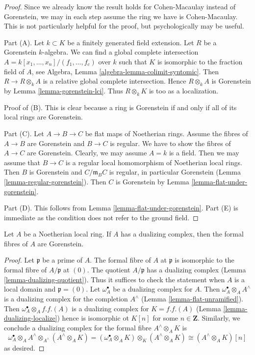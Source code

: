 \begin{proof}
Since we already know the result holds for Cohen-Macaulay instead
of Gorenstein, we may in each step assume the ring we have is
Cohen-Macaulay. This is not particularly helpful for the proof, but
psychologically may be useful.

\medskip\noindent
Part (A). Let $k \subset K$ be a finitely generated field extension.
Let $R$ be a Gorenstein $k$-algebra.
We can find a global complete intersection
$A = k[x_1, \ldots, x_n]/(f_1, \ldots, f_c)$
over $k$ such that $K$ is isomorphic to the fraction field of $A$, see
Algebra, Lemma \ref{algebra-lemma-colimit-syntomic}.
Then $R \to R \otimes_k A$ is a relative global complete intersection.
Hence $R \otimes_k A$ is Gorenstein by Lemma \ref{lemma-gorenstein-lci}.
Thus $R \otimes_k K$ is too as a localization.

\medskip\noindent
Proof of (B). This is clear because a ring is Gorenstein
if and only if all of its local rings are Gorenstein.

\medskip\noindent
Part (C). Let $A \to B \to C$ be flat maps of Noetherian rings.
Assume the fibres of $A \to B$ are Gorenstein and $B \to C$ is regular.
We have to show the fibres of $A \to C$ are Gorenstein.
Clearly, we may assume $A = k$ is a field. Then we may assume that
$B \to C$ is a regular local homomorphism of Noetherian local rings.
Then $B$ is Gorenstein and $C/\mathfrak m_B C$ is regular, in
particular Gorenstein (Lemma \ref{lemma-regular-gorenstein}).
Then $C$ is Gorenstein by
Lemma \ref{lemma-flat-under-gorenstein}.

\medskip\noindent
Part (D). This follows from Lemma \ref{lemma-flat-under-gorenstein}.
Part (E) is immediate as the condition does not refer to the ground field.
\end{proof}

\begin{lemma}
\label{lemma-dualizing-gorenstein-formal-fibres}
Let $A$ be a Noetherian local ring. If $A$ has a dualizing complex,
then the formal fibres of $A$ are Gorenstein.
\end{lemma}

\begin{proof}
Let $\mathfrak p$ be a prime of $A$. The formal fibre of $A$ at $\mathfrak p$
is isomorphic to the formal fibre of $A/\mathfrak p$ at $(0)$. The quotient
$A/\mathfrak p$ has a dualizing complex
(Lemma \ref{lemma-dualizing-quotient}).
Thus it suffices to check the statement
when $A$ is a local domain and $\mathfrak p = (0)$.
Let $\omega_A^\bullet$ be a dualizing complex for $A$. Then
$\omega_A^\bullet \otimes_A A^\wedge$ is a dualizing complex
for the completion $A^\wedge$
(Lemma \ref{lemma-flat-unramified}).
Then $\omega_A^\bullet \otimes_A f.f.(A)$ is a dualizing
complex for $K = f.f.(A)$
(Lemma \ref{lemma-dualizing-localize})
hence is isomorphic ot $K[n]$ for some $n \in \mathbf{Z}$.
Similarly, we conclude a dualizing complex for the formal fibre
$A^\wedge \otimes_A K$ is
$$
\omega_A^\bullet \otimes_A A^\wedge \otimes_{A^\wedge} (A^\wedge \otimes_A K) =
(\omega_A^\bullet \otimes_A K) \otimes_K (A^\wedge \otimes_A K) \cong
(A^\wedge \otimes_A K)[n]
$$
as desired.
\end{proof}

